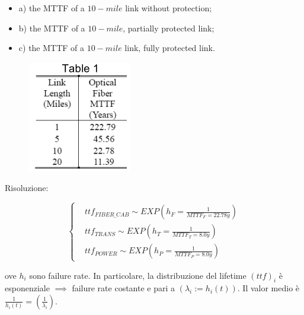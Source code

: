 \begin{itemize}

\item{a)} the MTTF of a $10-mile$ link without protection;
\item{b)} the MTTF of a $10-mile$, partially protected link;
\item{c)} the MTTF of a $10-mile$ link, fully protected link.
\end{itemize}

\begin{figure}[H]
\centering
\includegraphics[scale=1]{figures/ex/mttfflt.png}
\end{figure}

Risoluzione:

\[
	\left\{
	\begin{aligned}
	&ttf_{FIBER\_CAB}\sim EXP(h_F=\frac{1}{MTTF_F=22.78y})\\
	&ttf_{TRANS}\sim EXP(h_T=\frac{1}{MTTF_T=8.0y})\\
	&ttf_{POWER}\sim EXP(h_P=\frac{1}{MTTF_P=8.0y})
	\end{aligned}
	\right.
\]

ove $h_i$ sono failure rate. In particolare, la distribuzione del lifetime $(ttf)_i$ è esponenziale $\implies$ failure rate costante e pari a $(\lambda_i:=h_i(t))$. Il valor medio è $\frac{1}{h_i(t)}=(\frac{1}{\lambda_i})$.

